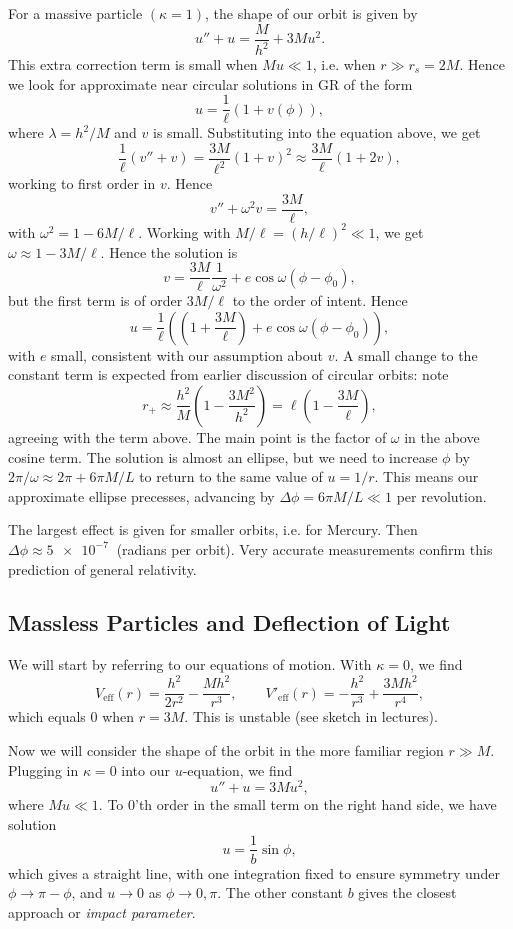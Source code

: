 \documentclass[12pt]{article}
\begin{document}
For a massive particle $(\kappa = 1)$, the shape of our orbit is given by
\[
u'' + u = \frac{M}{h^2} + 3Mu^2.
\]
This extra correction term is small when $M u \ll 1$, i.e. when $r \gg r_s = 2M$. Hence we look for approximate near circular solutions in GR of the form
 \[
u = \frac{1}{\ell }(1 + v(\phi)),
\]
where $\lambda = h^2/M$ and $v$ is small. Substituting into the equation above, we get
\[
\frac{1}{\ell }(v'' + v) = \frac{3M}{\ell^2}(1 + v)^2 \approx \frac{3M}{\ell }(1 + 2v),
\]
working to first order in $v$. Hence
\[
v'' + \omega^2 v = \frac{3M}{\ell },
\]
with $\omega^2 = 1 - 6M/\ell $. Working with $M/\ell = (h/\ell)^2 \ll 1$, we get $\omega \approx 1 - 3M/\ell $. Hence the solution is
\[
v = \frac{3M}{\ell }\frac{1}{\omega^2} + e \cos \omega (\phi - \phi_0),
\]
but the first term is of order $3M/\ell $ to the order of intent. Hence
\[
u = \frac{1}{\ell }\left( \left( 1 + \frac{3M}{\ell }\right) + e \cos \omega(\phi - \phi_0) \right),
\]
with $e$ small, consistent with our assumption about $v$. A small change to the constant term is expected from earlier discussion of circular orbits: note
\[
r_+ \approx \frac{h^2}{M} \left( 1 - \frac{3M^2}{h^2} \right) = \ell \left( 1 - \frac{3M}{\ell } \right),
\]
agreeing with the term above. The main point is the factor of $\omega$ in the above cosine term. The solution is almost an ellipse, but we need to increase $\phi$ by $2\pi/\omega \approx 2 \pi + 6 \pi M/L$ to return to the same value of $u = 1/r$. This means our approximate ellipse precesses, advancing by $\Delta \phi= 6\pi M/L \ll 1$ per revolution.

The largest effect is given for smaller orbits, i.e. for Mercury. Then $\Delta \phi \approx \qty{5e-7}{}$ (radians per orbit). Very accurate measurements confirm this prediction of general relativity.

\subsection{Massless Particles and Deflection of Light}
\label{sub:mles_part}

We will start by referring to our equations of motion. With $\kappa = 0$, we find
\[
V_{\mathrm{eff}}(r) = \frac{h^2}{2r^2} - \frac{Mh^2}{r^3}, \qquad V'_{\mathrm{eff}}(r) = - \frac{h^2}{r^3} + \frac{3Mh^2}{r^4},
\]
which equals $0$ when $r = 3M$. This is unstable (see sketch in lectures).

Now we will consider the shape of the orbit in the more familiar region $r \gg M$. Plugging in $\kappa = 0$ into our $u$-equation, we find
\[
u'' + u = 3Mu^2,
\]
where $M u \ll 1$. To $0$'th order in the small term on the right hand side, we have solution
\[
u = \frac{1}{b} \sin \phi,
\]
which gives a straight line, with one integration fixed to ensure symmetry under $\phi \to \pi - \phi$, and $u \to 0$ as $\phi \to 0, \pi$. The other constant $b$ gives the closest approach or \emph{impact parameter}.
\end{document}
